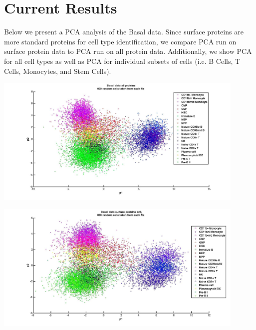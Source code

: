 \documentclass{article} %
\begin{document}


\section{Current Results}

Below we present a PCA analysis of the Basal data. Since surface proteins are more standard proteins for cell type identification, we compare PCA run on surface protein data to PCA run on all protein data. Additionally, we show PCA for all cell types as well as PCA for individual subsets of cells (i.e. B Cells, T Cells, Monocytes, and Stem Cells).

\begin{minipage}{\linewidth}
\centering
  \includegraphics[width=120mm]{Basal_AllProtein_AllCells.jpg}
\end{minipage}

\begin{minipage}{\linewidth}
\centering
  \includegraphics[width=120mm]{Basal_SurfaceProtein_AllCells.jpg}
\end{minipage}
\end{document}
